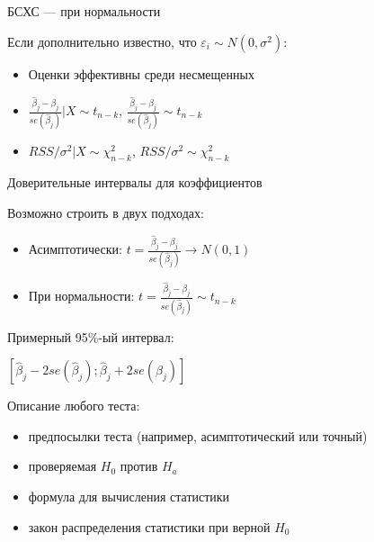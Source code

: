 \documentclass[ignorenonframetext,]{beamer}
\begin{document}
\begin{frame}{БСХС --- при нормальности}

Если дополнительно известно, что $\varepsilon_i \sim N(0, \sigma^2)$:

\begin{itemize}
\itemsep1pt\parskip0pt
\item
  Оценки эффективны среди несмещенных
\item
  $\frac{\hat{\beta}_j-\beta_j}{se(\hat{\beta}_j)}|X \sim t_{n-k}$,
  $\frac{\hat{\beta}_j-\beta_j}{se(\hat{\beta}_j)}\sim t_{n-k}$
\item
  $RSS/\sigma^2 |X \sim \chi^2_{n-k}$, $RSS/\sigma^2 \sim \chi^2_{n-k}$
\end{itemize}

\end{frame}

\begin{frame}{Доверительные интервалы для коэффициентов}

Возможно строить в двух подходах:

\begin{itemize}
\item
  Асимптотически:
  $t=\frac{\hat{\beta}_j-\beta_j}{se(\hat{\beta}_j)} \to N(0,1)$
\item
  При нормальности:
  $t=\frac{\hat{\beta}_j-\beta_j}{se(\hat{\beta}_j)} \sim t_{n-k}$
\end{itemize}

Примерный 95\%-ый интервал:

$[\hat{\beta}_j-2se(\hat{\beta}_j);\hat{\beta}_j+2se(\hat{\beta}_j) ] $

\end{frame}

\begin{frame}{Описание любого теста:}

\begin{itemize}
\itemsep1pt\parskip0pt
\item
  предпосылки теста (например, асимптотический или точный)
\item
  проверяемая $H_0$ против $H_a$
\item
  формула для вычисления статистики
\item
  закон распределения статистики при верной $H_0$
\end{itemize}

\end{frame}
\end{document}
